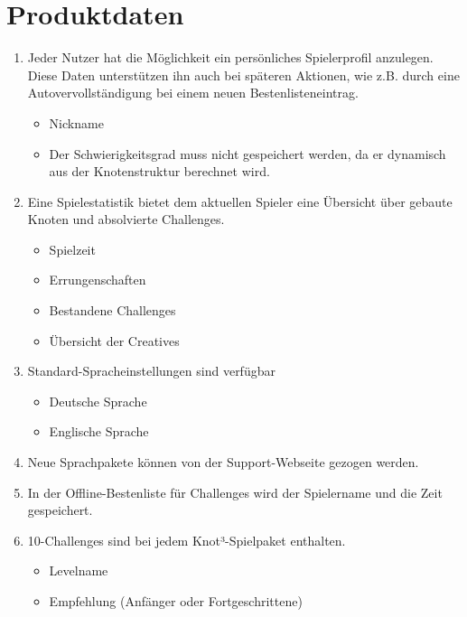\chapter{Produktdaten}

\renewcommand{\theenumi}{/PD\_\arabic{enumi}0/}
\renewcommand{\labelenumi}{\theenumi}


\begin{enumerate}

\item Jeder Nutzer hat die Möglichkeit ein persönliches Spielerprofil anzulegen. Diese Daten unterstützen ihn auch bei späteren Aktionen, wie z.B. durch eine Autovervollständigung bei einem neuen Bestenlisteneintrag. 

  \begin{itemize}
     \item Nickname
     \item Der Schwierigkeitsgrad muss nicht gespeichert werden, da er dynamisch aus der Knotenstruktur berechnet wird.
  \end{itemize}

\item Eine Spielestatistik bietet dem aktuellen Spieler eine Übersicht über gebaute Knoten und absolvierte Challenges.

  \begin{itemize}
     \item Spielzeit
     \item Errungenschaften
     \item Bestandene Challenges
     \item Übersicht der Creatives
  \end{itemize}

\item Standard-Spracheinstellungen sind verfügbar

  \begin{itemize}
     \item Deutsche Sprache
     \item Englische Sprache
  \end{itemize}
  
\item Neue Sprachpakete können von der Support-Webseite gezogen werden.
\item In der Offline-Bestenliste für Challenges wird der Spielername und die Zeit gespeichert.
\item 10-Challenges sind bei jedem Knot³-Spielpaket enthalten.

  \begin{itemize}
     \item Levelname
     \item Empfehlung (Anfänger oder Fortgeschrittene)
  \end{itemize}


\end{enumerate}
